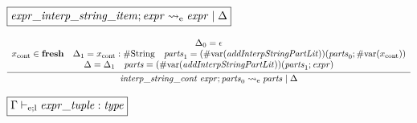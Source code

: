 $\fbox{$\mathit{expr\_interp\_string\_item}; \mathit{expr} \rightsquigarrow_\mathrm{e} \mathit{expr} \mid \Delta$}$

\begin{gather*}
    \infer{\mathit{interp\_string\_cont}\; \mathit{expr}; \mathit{parts}_0 \rightsquigarrow_\mathrm{e} \mathit{parts} \mid \Delta}{
        \begin{array}{c}
            \Delta_0 = \epsilon
            \\
            x_\mathrm{cont} \in \mathbf{fresh}
            \hspace{1em}
            \Delta_1 = x_\mathrm{cont}: \mathrm{\#String}
            \hspace{1em}
            \mathit{parts}_1 = (\mathrm{\#var}(\mathit{addInterpStringPartLit}))(\mathit{parts}_0; \mathrm{\#var}(x_\mathrm{cont}))
            \\
            \Delta = \Delta_1
            \hspace{1em}
            \mathit{parts} = (\mathrm{\#var}(\mathit{addInterpStringPartLit}))(\mathit{parts}_1; \mathit{expr})
        \end{array}
    }
\end{gather*}

$\fbox{$\Gamma \vdash_{\mathrm{e}; \mathrm{l}} \mathit{expr\_tuple}: \mathit{type}$}$

